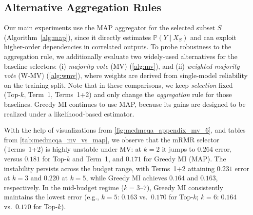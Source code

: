 \documentclass{article}
\theoremstyle{plain}
\theoremstyle{definition}
\theoremstyle{remark}
\begin{document}
\subsection{Alternative Aggregation Rules}
\label{app:medmcqa_agg}
Our main experiments use the MAP aggregator for the selected subset $S$ (Algorithm~\ref{alg:map}), since it directly estimates $\mathbb{P}(Y \mid X_S)$ and can exploit higher-order dependencies in correlated outputs. To probe robustness to the aggregation rule, we additionally evaluate two widely-used alternatives for the baseline selectors: (i) \emph{majority vote} (MV) (\cref{alg:mv}), and (ii) \emph{weighted majority vote} (W-MV) (\cref{alg:wmv}), where weights are derived from single-model reliability on the training split. Note that in these comparisons, we keep \emph{selection} fixed (Top-$k$, Term~1, Terms~1+2) and only change the \emph{aggregation} rule for those baselines. Greedy MI continues to use MAP, because its gains are designed to be realized under a likelihood-based estimator.

With the help of visualizations from \cref{fig:medmcqa_appendix_mv_6}, and tables from \cref{tab:medmcqa_mv_vs_map}, we observe that the mRMR selector (Terms~1+2) is highly unstable under MV: at $k=2$ it jumps to $0.264$ error, versus $0.181$ for Top-$k$ and Term~1, and $0.171$ for Greedy MI (MAP). The instability persists across the budget range, with Terms~1+2 attaining $0.231$ error at $k=3$ and $0.220$ at $k=5$, while Greedy MI achieves $0.164$ and $0.163$, respectively. In the mid-budget regime ($k=3$--$7$), Greedy MI consistently maintains the lowest error (e.g., $k=5$: $0.163$ vs.\ $0.170$ for Top-$k$; $k=6$: $0.164$ vs.\ $0.170$ for Top-$k$).
\end{document}
